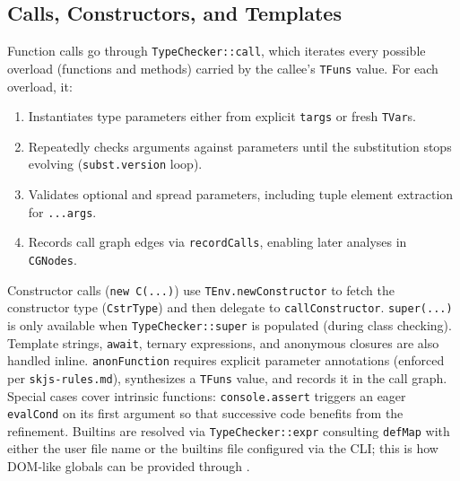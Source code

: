 \documentclass[11pt]{article}
\newcommand{\code}[1]{\path{#1}}
\begin{document}
\subsection{Calls, Constructors, and Templates}
Function calls go through \texttt{TypeChecker::call}, which iterates every possible overload (functions and methods) carried by the callee's \texttt{TFuns} value. For each overload, it:
\begin{enumerate}[leftmargin=*]
  \item Instantiates type parameters either from explicit \texttt{targs} or fresh \texttt{TVar}s.
  \item Repeatedly checks arguments against parameters until the substitution stops evolving (\texttt{subst.version} loop).
  \item Validates optional and spread parameters, including tuple element extraction for \texttt{...args}.
  \item Records call graph edges via \texttt{recordCalls}, enabling later analyses in \texttt{CGNodes}.
\end{enumerate}
Constructor calls (\texttt{new C(...)}) use \texttt{TEnv.newConstructor} to fetch the constructor type (\texttt{CstrType}) and then delegate to \texttt{callConstructor}. \texttt{super(...)} is only available when \texttt{TypeChecker::super} is populated (during class checking). Template strings, \texttt{await}, ternary expressions, and anonymous closures are also handled inline. \texttt{anonFunction} requires explicit parameter annotations (enforced per \texttt{skjs-rules.md}), synthesizes a \texttt{TFuns} value, and records it in the call graph.
Special cases cover intrinsic functions: \texttt{console.assert} triggers an eager \texttt{evalCond} on its first argument so that successive code benefits from the refinement. Builtins are resolved via \texttt{TypeChecker::expr} consulting \texttt{defMap} with either the user file name or the builtins file configured via the CLI; this is how DOM-like globals can be provided through \code{@types/skjs}.
\end{document}
